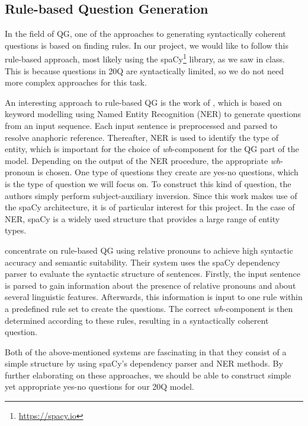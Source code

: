 \documentclass[11pt,a4paper]{article}
\begin{document}
\subsection{Rule-based Question Generation}
\label{subsec:qglit}

In the field of QG, one of the approaches to generating syntactically coherent questions is based on finding rules. 
In our project, we would like to follow this rule-based approach, most likely using the spaCy\footnote{\url{https://spacy.io}} library, as we saw in class.
This is because questions in 20Q are syntactically limited, so we do not need more complex approaches for this task.

An interesting approach to rule-based QG is the work of \citet{MhatreEa2019}, which is based on keyword modelling using Named Entity Recognition (NER) to generate questions from an input sequence. 
Each input sentence is preprocessed and parsed to resolve anaphoric reference. 
Thereafter, NER is used to identify the type of entity, which is important for the choice of \textit{wh}-component for the QG part of the model. 
Depending on the output of the NER procedure, the appropriate \textit{wh}-pronoun is chosen. 
One type of questions they create are yes-no questions, which is the type of question we will focus on.
To construct this kind of question, the authors simply perform subject-auxiliary inversion. 
Since this work makes use of the spaCy architecture, it is of particular interest for this project.
In the case of NER, spaCy is a widely used structure that provides a large range of entity types. 

\citet{KhullarEa2018} concentrate on rule-based QG using relative pronouns to achieve high syntactic accuracy and semantic suitability. 
Their system uses the spaCy dependency parser to evaluate the syntactic structure of sentences. 
Firstly, the input sentence is parsed to gain information about the presence of relative pronouns and about several linguistic features. 
Afterwards, this information is input to one rule within a predefined rule set to create the questions. 
The correct \textit{wh}-component is then determined according to these rules, resulting in a syntactically coherent question. 

Both of the above-mentioned systems are fascinating in that they consist of a simple structure by using spaCy's dependency parser and NER methods. 
By further elaborating on these approaches, we should be able to construct simple yet appropriate yes-no questions for our 20Q model.
\end{document}
